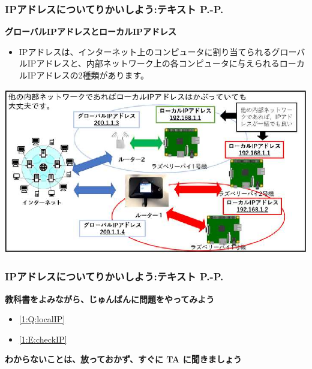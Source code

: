 \documentclass[dvipdfmx]{beamer}
\begin{document}
\begin{frame}[fragile]
	\frametitle{\large{IPアドレスについてりかいしよう:テキスト P.\pageref{1:P:IP}-P.\pageref{1:P:port}}~~~}
    \large\textbf{グローバルIPアドレスとローカルIPアドレス}
            \begin{itemize}
                \item IPアドレスは、インターネット上のコンピュータに割り当てられるグローバルIPアドレスと、内部ネットワーク上の各コンピュータに与えられるローカルIPアドレスの2種類があります。
            \end{itemize}
            \vfill
            
			\begin{minipage}{0.7\textwidth}
                {\upshape
                  \includegraphics[width=\textwidth]{ome7-img006}}
            \end{minipage}
\end{frame}

\begin{frame}[fragile]
	\frametitle{\large{IPアドレスについてりかいしよう:テキスト P.\pageref{1:P:IP}-P.\pageref{1:P:port}}~~~}
      \large\textbf{教科書をよみながら、じゅんばんに問題をやってみよう}
				\begin{itemize}
					\item \ref*{1:Q:localIP}
					\item \ref*{1:E:checkIP} 
				\end{itemize}
      \vfill
      \large\textbf{わからないことは、放っておかず、すぐに TA に聞きましょう}
\end{frame}
\end{document}
